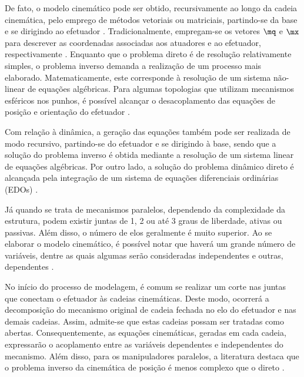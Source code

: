 \documentclass[]{politex}
\begin{document}
De fato, o modelo cinemático pode ser obtido, recursivamente ao longo da cadeia cinemática, pelo emprego de métodos vetoriais ou matriciais, partindo-se da base e se dirigindo ao efetuador \cite{Siciliano}. Tradicionalmente, empregam-se os vetores $\mq$ e $\mx$ para descrever as coordenadas associadas aos atuadores e ao efetuador, respectivamente \cite{Cabral, Carvalho}. Enquanto que o problema direto é de resolução relativamente simples, o problema inverso demanda a realização de um processo mais elaborado. Matematicamente, este corresponde à resolução de um sistema não-linear de equações algébricas. Para algumas topologias que utilizam mecanismos esféricos nos punhos, é possível alcançar o desacoplamento das equações de posição e orientação do efetuador \cite{Waldron}.

Com relação à dinâmica, a geração das equações também pode ser realizada de modo recursivo, partindo-se do efetuador e se dirigindo à base, sendo que a solução do problema inverso é obtida mediante a resolução de um sistema linear de equações algébricas. Por outro lado, a solução do problema dinâmico direto é alcançada pela integração de um sistema de equações diferenciais ordinárias (EDOs) \cite{Featherstone}.





Já quando se trata de mecanismos paralelos, dependendo da complexidade da estrutura, podem existir juntas de 1, 2 ou até 3 graus de liberdade, ativas ou passivas. Além disso, o número de elos geralmente é muito superior. Ao se elaborar o modelo cinemático, é possível notar que haverá um grande número de variáveis, dentre as quais algumas serão consideradas independentes e outras, dependentes \cite{Merlet}.

No início do processo de modelagem, é comum  se realizar um corte nas juntas que conectam o efetuador às cadeias cinemáticas. Deste modo, ocorrerá a decomposição do mecanismo original de cadeia fechada no elo do efetuador e nas demais cadeias. Assim, admite-se que estas cadeias possam ser tratadas como abertas. Consequentemente, as equações cinemáticas, geradas em cada cadeia, expressarão o acoplamento entre as variáveis dependentes e independentes do mecanismo. Além disso, para os manipuladores paralelos, a literatura destaca que o problema inverso da cinemática de posição é menos complexo que o direto \cite{Merlet}. 
\end{document}
